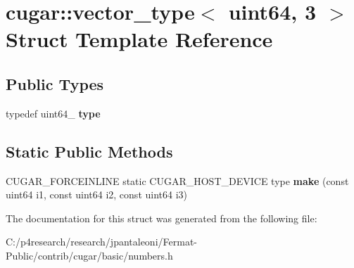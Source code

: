 \hypertarget{structcugar_1_1vector__type_3_01uint64_00_013_01_4}{}\section{cugar\+:\+:vector\+\_\+type$<$ uint64, 3 $>$ Struct Template Reference}
\label{structcugar_1_1vector__type_3_01uint64_00_013_01_4}
\subsection*{Public Types}
\begin{DoxyCompactItemize}
\item 
\mbox{\label{structcugar_1_1vector__type_3_01uint64_00_013_01_4_af6d67bbca973db27ae6cfc2da03b72d4}} 
typedef uint64\+\_ {\bfseries type}
\end{DoxyCompactItemize}
\subsection*{Static Public Methods}
\begin{DoxyCompactItemize}
\item 
\mbox{\label{structcugar_1_1vector__type_3_01uint64_00_013_01_4_a04af1237ca7b5fb7af6e807c053b0c59}} 
C\+U\+G\+A\+R\+\_\+\+F\+O\+R\+C\+E\+I\+N\+L\+I\+NE static C\+U\+G\+A\+R\+\_\+\+H\+O\+S\+T\+\_\+\+D\+E\+V\+I\+CE type {\bfseries make} (const uint64 i1, const uint64 i2, const uint64 i3)
\end{DoxyCompactItemize}


The documentation for this struct was generated from the following file\+:\begin{DoxyCompactItemize}
\item 
C\+:/p4research/research/jpantaleoni/\+Fermat-\/\+Public/contrib/cugar/basic/numbers.\+h\end{DoxyCompactItemize}
